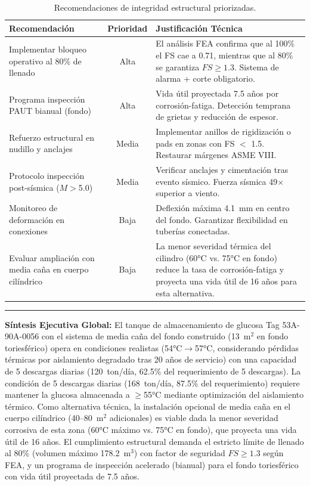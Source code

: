 \begin{table}[H]
\centering
\caption{Recomendaciones de integridad estructural priorizadas.}
\label{tab:resumen_recomendaciones_estructurales}
\setcounter{itemcount}{0}
\begin{tabularx}{\textwidth}{@{}lcX@{}}
\toprule
\textbf{Recomendación} & \textbf{Prioridad} & \textbf{Justificación Técnica} \\
\midrule
Implementar bloqueo operativo al 80\% de llenado & Alta & El análisis FEA confirma que al 100\% el FS cae a 0.71, mientras que al 80\% se garantiza $FS \geq 1.3$. Sistema de alarma + corte obligatorio. \\
\midrule
Programa inspección PAUT bianual (fondo) & Alta & Vida útil proyectada 7.5 años por corrosión-fatiga. Detección temprana de grietas y reducción de espesor. \\
\midrule
Refuerzo estructural en nudillo y anclajes & Media & Implementar anillos de rigidización o pads en zonas con FS $<$ 1.5. Restaurar márgenes ASME VIII. \\
\midrule
Protocolo inspección post-sísmica ($M>$5.0) & Media & Verificar anclajes y cimentación tras evento sísmico. Fuerza sísmica 49$\times$ superior a viento. \\
\midrule
Monitoreo de deformación en conexiones & Baja & Deflexión máxima 4.1~mm en centro del fondo. Garantizar flexibilidad en tuberías conectadas. \\
\midrule
Evaluar ampliación con media caña en cuerpo cilíndrico & Baja & La menor severidad térmica del cilindro (60°C vs. 75°C en fondo) reduce la tasa de corrosión-fatiga y proyecta una vida útil de 16 años para esta alternativa. \\
\bottomrule
\end{tabularx}
\end{table}

\vspace{1em}
\noindent\rule{\textwidth}{0.5pt}

\textbf{Síntesis Ejecutiva Global:} El tanque de almacenamiento de glucosa Tag 53A-90A-0056 con el sistema de media caña del fondo construido (13~m$^2$ en fondo toriesférico) opera en condiciones realistas (54°C$\rightarrow$57°C, considerando pérdidas térmicas por aislamiento degradado tras 20 años de servicio) con una capacidad de 5 descargas diarias (120~ton/día, 62.5\% del requerimiento de 5 descargas). La condición de 5 descargas diarias (168~ton/día, 87.5\% del requerimiento) requiere mantener la glucosa almacenada a $\geq$55°C mediante optimización del aislamiento térmico. Como alternativa técnica, la instalación opcional de media caña en el cuerpo cilíndrico (40--80~m$^2$ adicionales) es viable dada la menor severidad corrosiva de esta zona (60°C máximo vs. 75°C en fondo), que proyecta una vida útil de 16 años. El cumplimiento estructural demanda el estricto límite de llenado al 80\% (volumen máximo 178.2~m$^3$) con factor de seguridad $FS \geq 1.3$ según FEA, y un programa de inspección acelerado (bianual) para el fondo toriesférico con vida útil proyectada de 7.5 años.

\newpage
